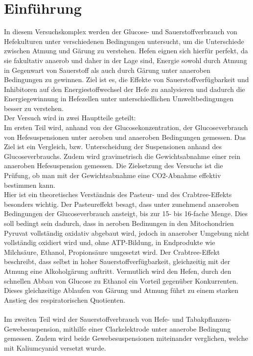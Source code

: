 \documentclass[10pt,a4paper]{article}
\begin{document}
	\section{Einführung}	
		In diesem Versuchskomplex werden der Glucose- und Sauerstoffverbrauch von Hefekulturen unter verschiedenen Bedingungen untersucht, um die Unterschiede zwischen Atmung und Gärung zu verstehen. Hefen eignen sich hierfür perfekt, da sie fakultativ anaerob und daher in der Lage sind, Energie sowohl durch Atmung in Gegenwart von Sauerstoff als auch durch Gärung unter anaeroben Bedingungen zu gewinnen.  Ziel ist es, die Effekte von Sauerstoffverfügbarkeit und Inhibitoren auf den Energiestoffwechsel der Hefe zu analysieren und dadurch die Energiegewinnung in Hefezellen unter unterschiedlichen Umweltbedingungen besser zu verstehen.\\
		Der Versuch wird in zwei Hauptteile geteilt:\\
		Im ersten Teil wird, anhand von der Glucosekonzentration, der Glucoseverbrauch von Hefesuspensionen unter aeroben und anaeroben Bedingungen gemessen. Das Ziel ist ein Vergleich, bzw. Unterscheidung der Suspensionen anhand des Glucoseverbrauchs.
		Zudem wird gravimetrisch die Gewichtsabnahme einer rein anaeroben Hefesuspension gemessen. Die Zielsetzung des Versuchs ist die Prüfung, ob man mit der Gewichtsabnahme eine CO2-Abnahme effektiv bestimmen kann. \\
		Hier ist ein theoretisches Verständnis des Pasteur- und des Crabtree-Effekts besonders wichtig. Der Pasteureffekt besagt, dass unter zunehmend anaeroben Bedingungen der Glucoseverbrauch ansteigt, bis zur 15- bis 16-fache Menge. Dies soll bedingt sein dadurch, dass in aeroben Bedinungen in den Mitochondrien Pyruvat vollständig oxidativ abgebaut wird, jedoch in anaerober Umgebung nicht vollständig oxidiert wird und, ohne ATP-Bildung, in Endprodukte wie Milchsäure, Ethanol, Propionsäure umgesetzt wird. Der Crabtree-Effekt beschreibt, dass selbst in hoher Sauerstoffverfügbarkeit, gleichzeitig mit der Atmung eine Alkoholgärung auftritt. Vermutlich wird den Hefen, durch den schnellen Abbau von Glucose zu Ethanol ein Vorteil gegenüber Konkurrenten. Dieses gleichzeitige Ablaufen von Gärung und Atmung führt zu einem starken Anstieg des respiratorischen Quotienten. \\
		\\
		Im zweiten Teil wird der Sauerstoffverbrauch von Hefe- und Tabakpflanzen-Gewebesuspension, mithilfe einer Clarkelektrode unter anaerobe Bedingung gemessen. Zudem wird beide Gewebesuspensionen miteinander verglichen, welche mit Kaliumcyanid versetzt wurde. \\
\end{document}
